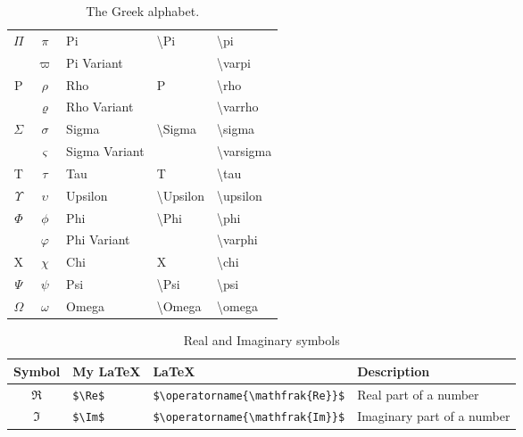 \begin{table}[!htb]
\begin{tabularx}{\linewidth}{ c c l l l }
  $\Pi$           & $\pi$      & Pi      & \textbackslash Pi     & \textbackslash pi \\
                  & $\varpi$ & Pi Variant &                      & \textbackslash varpi \\
  P               & $\rho$     & Rho     & P                     & \textbackslash rho \\
                  & $\varrho$ & Rho Variant &                  & \textbackslash varrho \\
  $\Sigma$        & $\sigma$   & Sigma   & \textbackslash Sigma  & \textbackslash sigma \\
                  & $\varsigma$ & Sigma Variant &                  & \textbackslash varsigma \\
  T               & $\tau$     & Tau     & T                     & \textbackslash tau \\
  $\Upsilon$      & $\upsilon$ & Upsilon & \textbackslash Upsilon & \textbackslash upsilon \\
  $\Phi$          & $\phi$     & Phi     & \textbackslash Phi    & \textbackslash phi \\
                  & $\varphi$ & Phi Variant &                  & \textbackslash varphi \\
  X               & $\chi$     & Chi     & X                     & \textbackslash chi \\
  $\Psi$          & $\psi$     & Psi     & \textbackslash Psi    & \textbackslash psi \\
  $\Omega$        & $\omega$   & Omega   & \textbackslash Omega  & \textbackslash omega    
\end{tabularx}
\caption{The Greek alphabet.}
\label{tab:GreekAlphabet}
\end{table}

\begin{table}[!htb]
\begin{tabularx}{\linewidth}{ c l l l } \hline
  Symbol & My \LaTeX & \LaTeX & Description \\
  \hline
  $\Re$ & \texttt{\$\textbackslash Re\$} & \texttt{\$\textbackslash operatorname\{\textbackslash mathfrak\{Re\}\}\$} & Real part of a number \\
  $\Im$ & \texttt{\$\textbackslash Im\$} & \texttt{\$\textbackslash operatorname\{\textbackslash mathfrak\{Im\}\}\$} & Imaginary part of a number \\
\end{tabularx}
\caption{Real and Imaginary symbols}
\label{tab:RealImaginarySymbols}
\end{table}